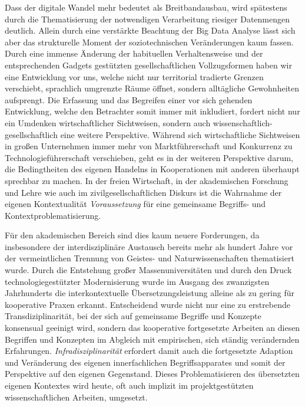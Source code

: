 \documentclass[a4paper,11pt]{article}
\begin{document}
Dass der digitale Wandel mehr bedeutet als Breitbandausbau, wird spätestens
durch die Thematisierung der notwendigen Verarbeitung riesiger Datenmengen
deutlich. Allein durch eine verstärkte Beachtung der Big Data Analyse lässt
sich aber das strukturelle Moment der soziotechnischen Veränderungen kaum
fassen. Durch eine immense Änderung der habituellen Verhaltensweise und der
entsprechenden Gadgets gestützten gesellschaftlichen Vollzugsformen haben wir
eine Entwicklung vor uns, welche nicht nur territorial tradierte Grenzen
verschiebt, sprachlich umgrenzte Räume öffnet, sondern alltägliche
Gewohnheiten aufsprengt. Die Erfassung und das Begreifen einer vor sich
gehenden Entwicklung, welche den Betrachter somit immer mit inkludiert,
fordert nicht nur ein Umdenken wirtschaftlicher Sichtweisen, sondern auch
wissenschaftlich-gesellschaftlich eine weitere Perspektive. Während sich
wirtschaftliche Sichtweisen in großen Unternehmen immer mehr von
Marktführerschaft und Konkurrenz zu Technologieführerschaft verschieben, geht
es in der weiteren Perspektive darum, die Bedingtheiten des eigenen Handelns
in Kooperationen mit anderen überhaupt sprechbar zu machen. In der freien
Wirtschaft, in der akademischen Forschung und Lehre wie auch im
zivilgesellschaftlichen Diskurs ist die Wahrnahme der eigenen Kontextualität
\emph{Voraussetzung} für eine gemeinsame Begriffs- und
Kontextproblematisierung.

Für den akademischen Bereich sind dies kaum neuere Forderungen, da
insbesondere der interdisziplinäre Austausch bereits mehr als hundert Jahre
vor der vermeintlichen Trennung von Geistes- und Naturwissenschaften
thematisiert wurde. Durch die Entstehung großer Massenuniversitäten und durch
den Druck technologiegestützter Modernisierung wurde im Ausgang des
zwanzigsten Jahrhunderts die interkontextuelle Übersetzungsleistung alleine
als zu gering für kooperative Praxen erkannt.  Entscheidend wurde nicht nur
eine zu erstrebende Transdiziplinarität, bei der sich auf gemeinsame Begriffe
und Konzepte konsensual geeinigt wird, sondern das kooperative fortgesetzte
Arbeiten an diesen Begriffen und Konzepten im Abgleich mit empirischen, sich
ständig verändernden Erfahrungen.  \emph{Infradisziplinarität} erfordert damit
auch die fortgesetzte Adaption und Veränderung des eigenen innerfachlichen
Begriffsapparates und somit der Perspektive auf den eigenen Gegenstand. Dieses
Problematisieren des übersetzten eigenen Kontextes wird heute, oft auch
implizit im projektgestützten wissenschaftlichen Arbeiten, umgesetzt.
\end{document}
